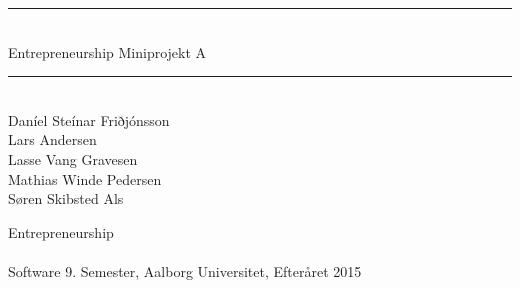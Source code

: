 %
%
%
%
% 



\begin{titlepage}



\begin{center}
\newcommand{\HRule}{\rule{\linewidth}{0.5mm}}
\HRule \\[0.4cm]
\Huge Entrepreneurship Miniprojekt A \\[0.3cm]

\HRule \\[1cm]
\noindent
  {\small
  Daníel Steínar Friðjónsson\\
  Lars Andersen\\
  Lasse Vang Gravesen\\
  Mathias Winde Pedersen\\
  Søren Skibsted Als\\}

\vfill
{\Large Entrepreneurship}
\\ ~\\
{\large Software 9. Semester, Aalborg Universitet, Efteråret 2015}

\end{center}
\end{titlepage}

\pagestyle{empty} %
%

\pagestyle{fancy} %
\setcounter{tocdepth}{1}
%






\label{bib:mybiblio}

\appendix
%


